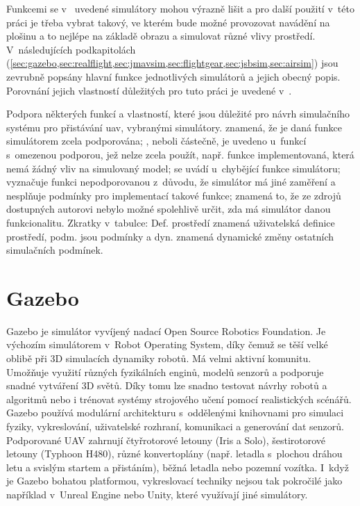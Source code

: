     Funkcemi se v~ uvedené simulátory mohou výrazně lišit a pro další použití v~této práci je třeba vybrat takový, ve kterém bude možné provozovat navádění na plošinu a to nejlépe na základě obrazu a simulovat různé vlivy prostředí. V~následujících podkapitolách (\cref{sec:gazebo,sec:realflight,sec:jmavsim,sec:flightgear,sec:jsbsim,sec:airsim}) jsou zevrubně popsány hlavní funkce jednotlivých simulátorů a jejich obecný popis. 
    Porovnání jejich vlastností důležitých pro tuto práci je uvedené v~.

    \begin{table}
        \centering
        
        \caption[Vlastnosti vybraných simulátorů]{Podpora některých funkcí a vlastností, které jsou důležité pro návrh simulačního systému pro přistávání \acrshort{uav}, vybranými simulátory.  znamená, že je daná funkce simulátorem zcela podporována; , neboli částečně, je uvedeno u~funkcí s~omezenou podporou, jež nelze zcela použít, např. funkce implementovaná, která nemá žádný vliv na simulovaný model;  se uvádí u~chybějící funkce simulátoru; \uv{-} vyznačuje funkci nepodporovanou z~důvodu, že simulátor má jiné zaměření a nesplňuje podmínky pro implementací takové funkce;  znamená to, že ze zdrojů dostupných autorovi nebylo možné spolehlivě určit, zda má simulátor danou funkcionalitu. Zkratky v~tabulce: Def. prostředí znamená uživatelská definice prostředí, podm. jsou podmínky a dyn. znamená dynamické změny ostatních simulačních podmínek.}
        \label{tab:simsfeatures}
    \end{table}

    \section{Gazebo} \label{sec:gazebo}
        Gazebo je simulátor vyvíjený nadací Open Source Robotics Foundation. Je výchozím simulátorem v~Robot Operating System, díky čemuž se těší velké oblibě při 3D simulacích dynamiky robotů. Má velmi aktivní komunitu. Umožňuje využití různých fyzikálních enginů, modelů senzorů a podporuje snadné vytváření 3D světů. Díky tomu lze snadno testovat návrhy robotů a algoritmů nebo i trénovat systémy strojového učení pomocí realistických scénářů. Gazebo používá modulární architekturu s~oddělenými knihovnami pro simulaci fyziky, vykreslování, uživatelské rozhraní, komunikaci a generování dat senzorů. Podporované UAV zahrnují čtyřrotorové letouny (Iris a Solo), šestirotorové letouny (Typhoon H480), různé konvertoplány (např. letadla s~plochou dráhou letu a svislým startem a přistáním), běžná letadla nebo pozemní vozítka. I~když je Gazebo bohatou platformou, vykreslovací techniky nejsou tak pokročilé jako například v~Unreal Engine nebo Unity, které využívají jiné simulátory. \cite{Ebeid2018}
    
